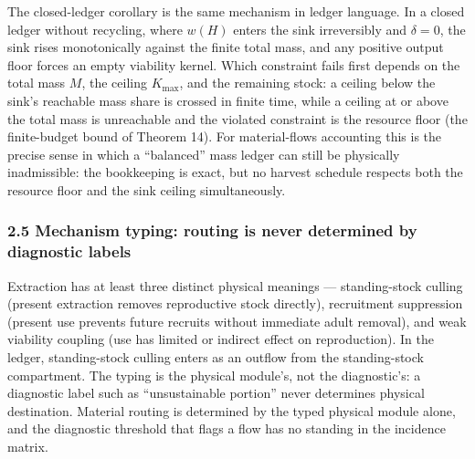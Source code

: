 \documentclass[11pt]{article}
\begin{document}
The closed-ledger corollary is the same mechanism in ledger language. In
a closed ledger without recycling, where \(w(H)\) enters the sink
irreversibly and \(\delta = 0\), the sink rises monotonically against
the finite total mass, and any positive output floor forces an empty
viability kernel. Which constraint fails first depends on the total mass
\(M\), the ceiling \(K_{\max}\), and the remaining stock: a ceiling
below the sink's reachable mass share is crossed in finite time, while a
ceiling at or above the total mass is unreachable and the violated
constraint is the resource floor (the finite-budget bound of Theorem
14). For material-flows accounting this is the precise sense in which a
``balanced'' mass ledger can still be physically inadmissible: the
bookkeeping is exact, but no harvest schedule respects both the resource
floor and the sink ceiling simultaneously.

\subsubsection{2.5 Mechanism typing: routing is never determined by
diagnostic
labels}\label{mechanism-typing-routing-is-never-determined-by-diagnostic-labels}

Extraction has at least three distinct physical meanings ---
standing-stock culling (present extraction removes reproductive stock
directly), recruitment suppression (present use prevents future recruits
without immediate adult removal), and weak viability coupling (use has
limited or indirect effect on reproduction). In the ledger,
standing-stock culling enters as an outflow from the standing-stock
compartment. The typing is the physical module's, not the diagnostic's:
a diagnostic label such as ``unsustainable portion'' never determines
physical destination. Material routing is determined by the typed
physical module alone, and the diagnostic threshold that flags a flow
has no standing in the incidence matrix.
\end{document}
